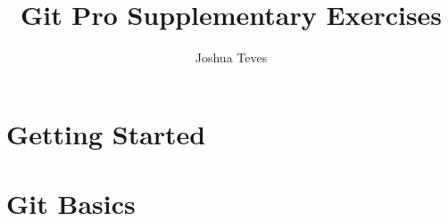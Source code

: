 \documentclass{report}
\title{Git Pro Supplementary Exercises}
\author{Joshua Teves}
\begin{document}
\maketitle

\chapter{Getting Started}


\chapter{Git Basics}

\end{document}
